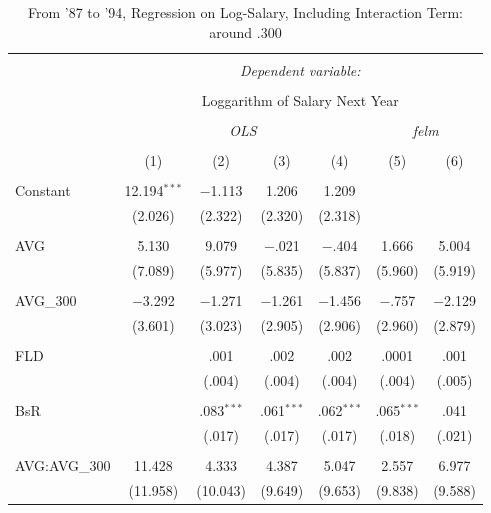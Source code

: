 
\begin{table}[H] \centering
  \caption{From '87 to '94, Regression on Log-Salary, Including Interaction Term: around .300}
  \label{AVG300_B}
\tiny
\begin{tabular}{@{\extracolsep{5pt}}lcccccc}
\\[-1.8ex]\hline
\hline \\[-1.8ex]
 & \multicolumn{6}{c}{\textit{Dependent variable:}} \\
\cline{2-7}
\\[-1.8ex] & \multicolumn{6}{c}{Loggarithm of Salary Next Year} \\
\\[-1.8ex] & \multicolumn{4}{c}{\textit{OLS}} & \multicolumn{2}{c}{\textit{felm}} \\
\\[-1.8ex] & (1) & (2) & (3) & (4) & (5) & (6)\\
\hline \\[-1.8ex]
 Constant & 12.194$^{***}$ & $-$1.113 & 1.206 & 1.209 &  &  \\
  & (2.026) & (2.322) & (2.320) & (2.318) &  &  \\
  & & & & & & \\
 AVG & 5.130 & 9.079 & $-$.021 & $-$.404 & 1.666 & 5.004 \\
  & (7.089) & (5.977) & (5.835) & (5.837) & (5.960) & (5.919) \\
  & & & & & & \\
 AVG\_300 & $-$3.292 & $-$1.271 & $-$1.261 & $-$1.456 & $-$.757 & $-$2.129 \\
  & (3.601) & (3.023) & (2.905) & (2.906) & (2.960) & (2.879) \\
  & & & & & & \\
 FLD &  & .001 & .002 & .002 & .0001 & .001 \\
  &  & (.004) & (.004) & (.004) & (.004) & (.005) \\
  & & & & & & \\
 BsR &  & .083$^{***}$ & .061$^{***}$ & .062$^{***}$ & .065$^{***}$ & .041 \\
  &  & (.017) & (.017) & (.017) & (.018) & (.021) \\
  & & & & & & \\
 AVG:AVG\_300 & 11.428 & 4.333 & 4.387 & 5.047 & 2.557 & 6.977 \\
  & (11.958) & (10.043) & (9.649) & (9.653) & (9.838) & (9.588) \\

\end{tabular}
\end{table}
